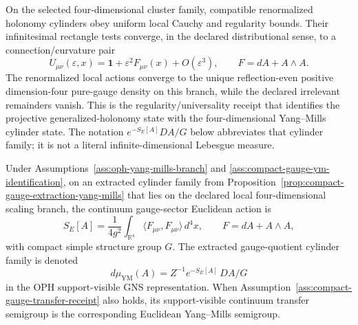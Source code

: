 \begin{assumption}
\label{ass:compact-gauge-ym-identification}
On the selected four-dimensional cluster family, compatible renormalized holonomy cylinders obey
uniform local Cauchy and regularity bounds. Their infinitesimal rectangle tests converge, in the
declared distributional sense, to a connection/curvature pair
\[
U_{\mu\nu}(\varepsilon,x)
=\mathbf 1+\varepsilon^2F_{\mu\nu}(x)+O(\varepsilon^3),
\qquad
F=dA+A\wedge A.
\]
The renormalized local actions converge to the unique reflection-even positive
dimension-four pure-gauge density on this branch, while the declared irrelevant remainders vanish.
This is the regularity/universality receipt that identifies the projective generalized-holonomy
state with the four-dimensional Yang--Mills cylinder state. The notation
\(e^{-S_E[A]}DA/G\) below abbreviates that cylinder family; it is not a literal
infinite-dimensional Lebesgue measure.
\end{assumption}

\begin{theorem}
\label{thm:oph-4d-euclidean-yang-mills-form}
Under Assumptions~\ref{ass:oph-yang-mills-branch} and
\ref{ass:compact-gauge-ym-identification}, on an extracted cylinder family from
Proposition~\ref{prop:compact-gauge-extraction-yang-mills} that lies on the declared local
four-dimensional scaling branch, the continuum gauge-sector Euclidean action is
\[
S_E[A]=\frac{1}{4g^2}\int_{\mathbb R^4}
\langle F_{\mu\nu},F_{\mu\nu}\rangle\,d^4x,
\qquad
F=dA+A\wedge A,
\]
with compact simple structure group \(G\). The extracted gauge-quotient cylinder family is denoted
\[
d\mu_{\mathrm{YM}}(A)=Z^{-1}e^{-S_E[A]}\,D A/G
\]
in the OPH support-visible GNS representation. When
Assumption~\ref{ass:compact-gauge-transfer-receipt} also holds, its support-visible continuum
transfer semigroup is the corresponding Euclidean Yang--Mills semigroup.
\end{theorem}

